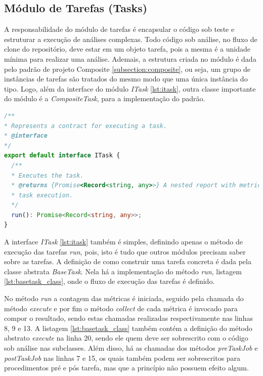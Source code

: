 \documentclass[12pt]{tcc}
\begin{document}
	\subsection{Módulo de Tarefas (Tasks)}
	\label{subsection:modulo-tasks}

	A responsabilidade do módulo de tarefas é encapsular o código sob teste e estruturar a execução de análises complexas.
	Todo código sob análise, no fluxo de clone do repositório, deve estar em um objeto tarefa, pois a mesma é a unidade mínima para realizar uma análise.
	Ademais, a estrutura criada no módulo é dada pelo padrão de projeto Composite \ref{subsection:composite}, ou seja, um grupo de instâncias de tarefas são tratados do mesmo modo que uma única instância do tipo.
	Logo, além da interface do módulo \emph{ITask} \ref{lst:itask}, outra classe importante do módulo é a \emph{CompositeTask}, para a implementação do padrão.

\begin{lstlisting}[label={lst:itask}, caption={Interface do módulo de tarefas.}, language=TypeScript, breaklines=true]
/**
* Represents a contract for executing a task.
* @interface
*/
export default interface ITask {
  /**
  * Executes the task.
  * @returns {Promise<Record<string, any>>} A nested report with metrics and metadata about the
  * task execution.
  */
  run(): Promise<Record<string, any>>;
}   
\end{lstlisting}

	A interface \emph{ITask} \ref{lst:itask} também é simples, definindo apenas o método de execução das tarefas \emph{run}, pois, isto é tudo que outros módulos precisam saber sobre as tarefas.
	A definição de como construir uma tarefa concreta é dada pela classe abstrata \emph{BaseTask}.
	Nela há a implementação do método \emph{run}, listagem \ref{lst:basetask_class}, onde o fluxo de execução das tarefas é definido.

	No método \emph{run} a contagem das métricas é iniciada, seguido pela chamada do método \emph{execute} e por fim o método \emph{collect} de cada métrica é invocado para compor o resultado, sendo estas chamadas realizadas respectivamente nas linhas 8, 9 e 13.
	A listagem \ref{lst:basetask_class} também contém a definição do método abstrato \emph{execute} na linha 20, sendo ele quem deve ser sobrescrito com o código sob análise nas subclasses.
	Além disso, há as chamadas dos métodos \emph{preTaskJob} e \emph{postTaskJob} nas linhas 7 e 15, os quais também podem ser sobrescritos para procedimentos pré e pós tarefa, mas que a princípio não possuem efeito algum.
\end{document}
